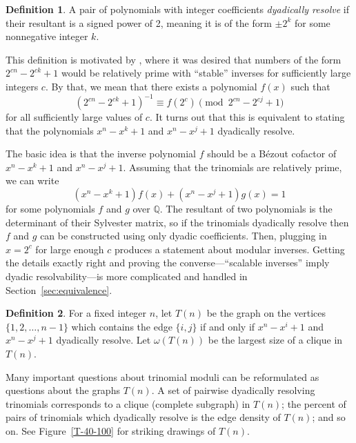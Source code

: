 \documentclass[]{article}
\theoremstyle{definition}
\newtheorem{definition}{Definition}
\newcommand{\tri}[3]{\ensuremath{#1^{#2} - #1^{#3} + 1}}
\begin{document}
\begin{definition}
    A pair of polynomials with integer coefficients \emph{dyadically
    resolve} if their resultant is a signed power of 2, meaning it is of the form $\pm 2^k$ for
    some nonnegative integer $k$.
\end{definition}

This definition is motivated by \cite{zima}, where it was desired that numbers
of the form $2^{cn} - 2^{ck} + 1$ would be relatively prime with ``stable''
inverses for sufficiently large integers $c$. By that, we mean that there exists
a polynomial $f(x)$ such that
\begin{equation*}
    (2^{cn} - 2^{ck} + 1)^{-1} \equiv f(2^c) \pmod{2^{cn} - 2^{cj} + 1}
\end{equation*}
for all sufficiently large values of $c$. It turns out that this is equivalent
to stating that the polynomials $x^n - x^k + 1$ and $x^n - x^j + 1$ dyadically
resolve.

The basic idea is that the inverse polynomial $f$ should be a B\'ezout cofactor
of $x^n - x^k + 1$ and $x^n - x^j + 1$. Assuming that the trinomials are
relatively prime, we can write \begin{equation*} (x^n - x^k + 1) f(x) + (x^n -
x^j + 1) g(x) = 1 \end{equation*} for some polynomials $f$ and $g$ over
$\mathbb{Q}$. The resultant of two polynomials is the determinant of their
Sylvester matrix, so if the trinomials dyadically resolve then $f$ and $g$ can
be constructed using only dyadic coefficients. Then, plugging in $x = 2^c$ for
large enough $c$ produces a statement about modular inverses. Getting the
details exactly right and proving the converse---``scalable inverses'' imply
dyadic resolvability---is more complicated and handled in
Section~\ref{sec:equivalence}.

\begin{definition}
    For a fixed integer $n$, let $T(n)$ be the graph on the vertices $\{1, 2,
    \dots, n - 1\}$ which contains the edge $\{i, j\}$ if and only if
    $\tri{x}{n}{i}$ and $\tri{x}{n}{j}$ dyadically resolve. Let $\omega(T(n))$
    be the largest size of a clique in $T(n)$.
\end{definition}

Many important questions about trinomial moduli can be reformulated as questions
about the graphs $T(n)$. A set of pairwise dyadically resolving trinomials
corresponds to a clique (complete subgraph) in $T(n)$; the percent of pairs of
trinomials which dyadically resolve is the edge density of $T(n)$; and so on.
See Figure~\ref{T-40-100} for striking drawings of $T(n)$.
\end{document}
